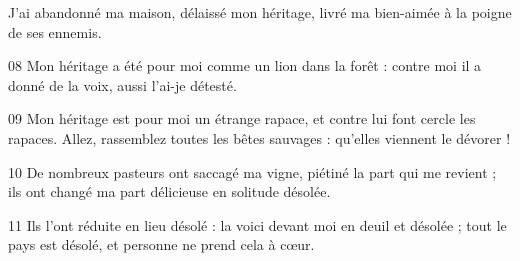 J’ai abandonné ma maison, délaissé mon héritage, livré ma bien-aimée à la poigne de ses ennemis.

08 Mon héritage a été pour moi comme un lion dans la forêt : contre moi il a donné de la voix, aussi l’ai-je détesté.

09 Mon héritage est pour moi un étrange rapace, et contre lui font cercle les rapaces. Allez, rassemblez toutes les bêtes sauvages : qu’elles viennent le dévorer !

10 De nombreux pasteurs ont saccagé ma vigne, piétiné la part qui me revient ; ils ont changé ma part délicieuse en solitude désolée.

11 Ils l’ont réduite en lieu désolé : la voici devant moi en deuil et désolée ; tout le pays est désolé, et personne ne prend cela à cœur.